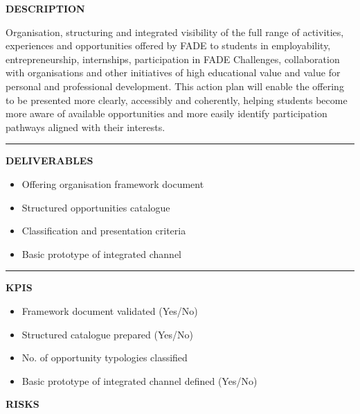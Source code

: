 \documentclass[11pt,a4paper]{scrreprt}
\newcommand{\fieldlabel}[1]{%
  {\footnotesize\sffamily\bfseries\color{mutedcolor}\MakeUppercase{#1}}\par\nopagebreak[4]
}
\newcommand{\fieldsep}{\vspace{3pt}\noindent\textcolor{bordercolor}{\rule{\linewidth}{0.4pt}}\vspace{3pt}\par}
\begin{document}
\begin{tcolorbox}[pabox={filcolor}{A.P.2.1 \enspace\textbullet\enspace Integrated Organisation and Visibility of the Opportunities Offering for Students}]

\fieldlabel{Description}
{\small Organisation, structuring and integrated visibility of the full range of activities, experiences and opportunities offered by FADE to students in employability, entrepreneurship, internships, participation in FADE Challenges, collaboration with organisations and other initiatives of high educational value and value for personal and professional development. This action plan will enable the offering to be presented more clearly, accessibly and coherently, helping students become more aware of available opportunities and more easily identify participation pathways aligned with their interests. }\par
\fieldsep
\fieldlabel{Deliverables}
{\small \begin{itemize}[noitemsep,topsep=2pt]
\item Offering organisation framework document
\item Structured opportunities catalogue
\item Classification and presentation criteria
\item Basic prototype of integrated channel
\end{itemize}}\par
\fieldsep
\fieldlabel{KPIs}
{\small \begin{itemize}[noitemsep,topsep=2pt]
\item Framework document validated (Yes/No)
\item Structured catalogue prepared (Yes/No)
\item No. of opportunity typologies classified
\item Basic prototype of integrated channel defined (Yes/No)
\end{itemize}}\par
\end{tcolorbox}
\begin{tcolorbox}[riskbox]
{\footnotesize\sffamily\bfseries\color{red!50!black} RISKS}\par{}
\end{tcolorbox}
\end{document}
